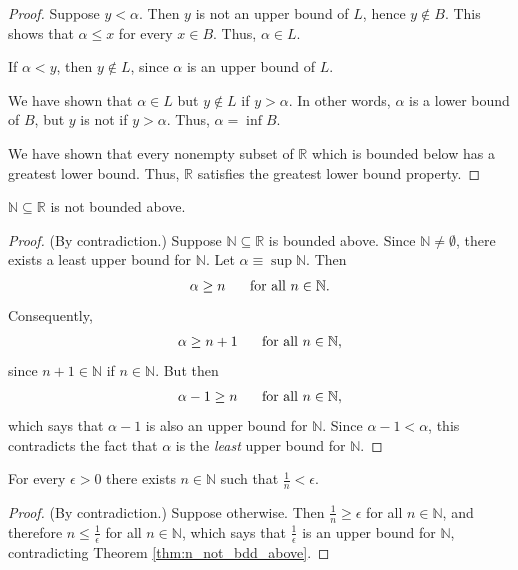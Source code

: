 \documentclass[12pt,letterpaper,reqno]{article}
\numberwithin{equation}{section}
\newcommand{\R}{\ensuremath{\mathbb R}}
\newcommand{\N}{{\mathbb N}}
\begin{document}
{\begin{proof}
	Suppose $y<\alpha$. Then $y$ is not an upper bound of $L$, hence $y \notin B$. This shows that $\alpha \leq x$ for every $x \in B$. Thus, $\alpha \in L$.
	
	If $\alpha<y$, then $y \notin L$, since $\alpha$ is an upper bound of $L$.
	
	We have shown that $\alpha \in L$ but $y \notin L$ if $y>\alpha$. In other words, $\alpha$ is a lower bound of $B$, but $y$ is not if $y>\alpha$. Thus, $\alpha=\inf B$.
	
	We have shown that every nonempty subset of $\R$ which is bounded below has a greatest lower bound. Thus, $\R$ satisfies the greatest lower bound property.
	
\end{proof}



\begin{thm}[$\N \subseteq \R$ is not bounded above.]\label{thm:n_not_bdd_above}
	$\N \subseteq \R$ is not bounded above.
\end{thm}

\begin{proof}
	(By contradiction.) Suppose $\N \subseteq \R$ is bounded above. Since $\N \neq \emptyset$, there exists a least upper bound for $\N$. Let $\alpha\equiv \sup \N$. Then
	\begin{align*}
		\alpha \geq n \hspace{0.5cm} \text{ for all $n \in \N$}.
	\end{align*}
	Consequently,
	\begin{align*}
		\alpha \geq n+1 \hspace{0.5cm} \text{ for all $n \in \N$},
	\end{align*}
	since $n+1 \in \N$ if $n \in \N$. But then
	\begin{align*}
		\alpha-1 \geq n \hspace{0.5cm} \text{ for all $n \in \N$},
	\end{align*}
	which says that $\alpha-1$ is also an upper bound for $\N$. Since $\alpha-1<\alpha$, this contradicts the fact that $\alpha$ is the \emph{least} upper bound for $\N$.
\end{proof}

\begin{cor}\label{cor:arch}
	For every $\epsilon>0$ there exists $n \in \N$ such that $\frac{1}{n}<\epsilon$.
\end{cor}

\begin{proof}
	(By contradiction.) Suppose otherwise. Then $\frac{1}{n}\geq \epsilon$ for all $n \in \N$, and therefore $n \leq \frac{1}{\epsilon}$ for all $n \in \N$, which says that $\frac{1}{\epsilon}$ is an upper bound for $\N$, contradicting Theorem \ref{thm:n_not_bdd_above}.
\end{proof}

}
\end{document}
